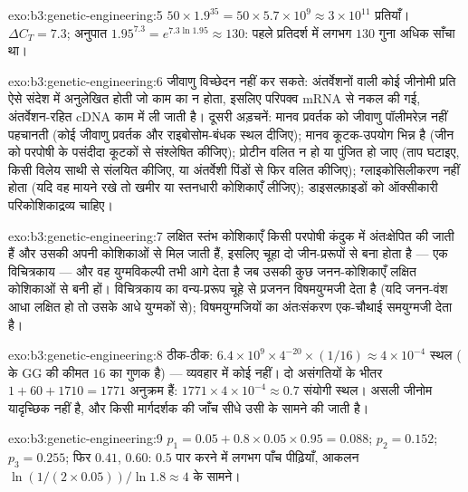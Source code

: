 \begin{solution}{exo:b3:genetic-engineering:5}
$50\times 1.9^{35} = 50\times 5.7\times 10^{9} \approx 3\times 10^{11}$
प्रतियाँ। $\Delta C_{T} = 7.3$; अनुपात $1.95^{7.3} = e^{7.3\ln 1.95}
\approx 130$: पहले प्रतिदर्श में लगभग $130$ गुना अधिक साँचा था।
\end{solution}

\begin{solution}{exo:b3:genetic-engineering:6}
जीवाणु विच्छेदन नहीं कर सकते: अंतर्वेशनों वाली कोई जीनोमी प्रति ऐसे
संदेश में अनुलेखित होती जो काम का न होता, इसलिए परिपक्व mRNA से नकल की
गई, अंतर्वेशन-रहित cDNA काम में ली जाती है। दूसरी अड़चनें: मानव प्रवर्तक
को जीवाणु पॉलीमरेज़ नहीं पहचानती (कोई जीवाणु प्रवर्तक और
राइबोसोम-बंधक स्थल दीजिए); मानव कूटक-उपयोग भिन्न है (जीन को परपोषी के
पसंदीदा कूटकों से संश्लेषित कीजिए); प्रोटीन वलित न हो या पुंजित हो जाए
(ताप घटाइए, किसी विलेय साथी से संलयित कीजिए, या अंतर्वेशी पिंडों से
फिर वलित कीजिए); ग्लाइकोसिलीकरण नहीं होता (यदि वह मायने रखे तो खमीर या
स्तनधारी कोशिकाएँ लीजिए); डाइसल्फ़ाइडों को ऑक्सीकारी परिकोशिकाद्रव्य चाहिए।
\end{solution}

\begin{solution}{exo:b3:genetic-engineering:7}
लक्षित स्तंभ कोशिकाएँ किसी परपोषी कंदुक में अंतःक्षेपित की जाती हैं और
उसकी अपनी कोशिकाओं से मिल जाती हैं, इसलिए चूहा दो जीन-प्ररूपों से बना
होता है --- एक विचित्रकाय --- और वह युग्मविकल्पी तभी आगे देता है जब
उसकी कुछ जनन-कोशिकाएँ लक्षित कोशिकाओं से बनी हों। विचित्रकाय का
वन्य-प्ररूप चूहे से प्रजनन विषमयुग्मजी देता है (यदि जनन-वंश आधा लक्षित
हो तो उसके आधे युग्मकों से); विषमयुग्मजियों का अंतःसंकरण एक-चौथाई
समयुग्मजी  देता है।
\end{solution}

\begin{solution}{exo:b3:genetic-engineering:8}
ठीक-ठीक: $6.4\times 10^{9}\times 4^{-20}\times (1/16) \approx 4\times
10^{-4}$ स्थल ( के GG की कीमत $16$ का गुणक है) --- व्यवहार में कोई
नहीं। दो असंगतियों के भीतर $1 + 60 + 1710 = 1771$
अनुक्रम हैं: $1771\times 4\times 10^{-4} \approx 0.7$ संयोगी स्थल।
असली जीनोम यादृच्छिक नहीं है, और किसी मार्गदर्शक की जाँच सीधे उसी के
सामने की जाती है।
\end{solution}

\begin{solution}{exo:b3:genetic-engineering:9}
$p_{1} = 0.05 + 0.8\times 0.05\times 0.95 = 0.088$; $p_{2} = 0.152$;
$p_{3} = 0.255$; फिर $0.41$, $0.60$: $0.5$ पार करने में लगभग पाँच
पीढ़ियाँ, आकलन $\ln(1/(2\times 0.05))/\ln 1.8 \approx 4$ के सामने।
\end{solution}

